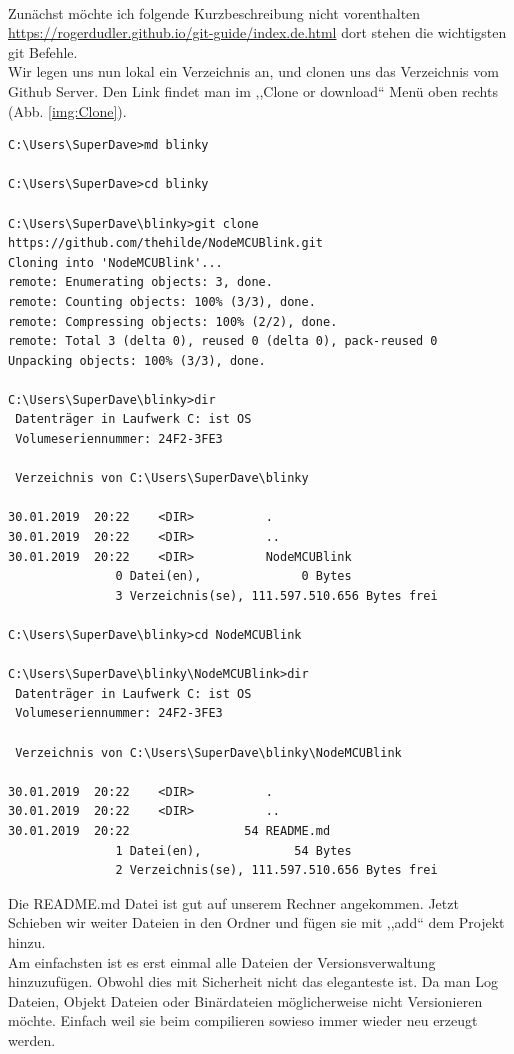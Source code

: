 \ \\
Zunächst möchte ich folgende Kurzbeschreibung  nicht vorenthalten \url{https://rogerdudler.github.io/git-guide/index.de.html} dort stehen die wichtigsten git Befehle.\\
Wir legen uns nun lokal ein Verzeichnis an, und clonen uns das Verzeichnis vom Github Server. Den Link findet man im ,,Clone or download`` Menü oben rechts (Abb. \ref{img:Clone}). \\
\begin{verbatim}
C:\Users\SuperDave>md blinky

C:\Users\SuperDave>cd blinky

C:\Users\SuperDave\blinky>git clone https://github.com/thehilde/NodeMCUBlink.git
Cloning into 'NodeMCUBlink'...
remote: Enumerating objects: 3, done.
remote: Counting objects: 100% (3/3), done.
remote: Compressing objects: 100% (2/2), done.
remote: Total 3 (delta 0), reused 0 (delta 0), pack-reused 0
Unpacking objects: 100% (3/3), done.

C:\Users\SuperDave\blinky>dir
 Datenträger in Laufwerk C: ist OS
 Volumeseriennummer: 24F2-3FE3

 Verzeichnis von C:\Users\SuperDave\blinky

30.01.2019  20:22    <DIR>          .
30.01.2019  20:22    <DIR>          ..
30.01.2019  20:22    <DIR>          NodeMCUBlink
               0 Datei(en),              0 Bytes
               3 Verzeichnis(se), 111.597.510.656 Bytes frei

C:\Users\SuperDave\blinky>cd NodeMCUBlink

C:\Users\SuperDave\blinky\NodeMCUBlink>dir
 Datenträger in Laufwerk C: ist OS
 Volumeseriennummer: 24F2-3FE3

 Verzeichnis von C:\Users\SuperDave\blinky\NodeMCUBlink

30.01.2019  20:22    <DIR>          .
30.01.2019  20:22    <DIR>          ..
30.01.2019  20:22                54 README.md
               1 Datei(en),             54 Bytes
               2 Verzeichnis(se), 111.597.510.656 Bytes frei

\end{verbatim}
Die README.md Datei ist gut auf unserem Rechner angekommen. Jetzt Schieben wir weiter Dateien in den Ordner und fügen sie mit ,,add`` dem Projekt hinzu.\\
Am einfachsten ist es erst einmal alle Dateien der Versionsverwaltung hinzuzufügen. Obwohl dies mit Sicherheit nicht das eleganteste ist. Da man Log Dateien, Objekt Dateien oder Binärdateien möglicherweise nicht Versionieren möchte. Einfach weil sie beim compilieren sowieso immer wieder neu erzeugt werden.\\
